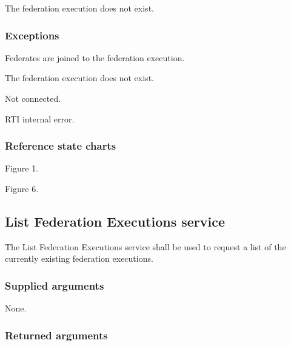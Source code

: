 \begin{stdalphalist}
    \item The federation execution does not exist.
\end{stdalphalist}

\clearpage

\begin{compactstdpage}
    \subsubsection{Exceptions}

    \begin{stdalphalist}
        \item Federates are joined to the federation execution.
        \item The federation execution does not exist.
        \item Not connected.
        \item RTI internal error.
    \end{stdalphalist}

    \subsubsection{Reference state charts}

    \begin{stdalphalist}
        \item Figure 1.
        \item Figure 6.
    \end{stdalphalist}

    \subsection{List Federation Executions service}

    The List Federation Executions service shall be used to request a list of the currently existing federation executions.

    \subsubsection{Supplied arguments}

    \begin{stdalphalist}
        \item None.
    \end{stdalphalist}

    \subsubsection{Returned arguments}


\end{compactstdpage}
